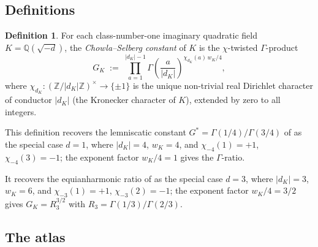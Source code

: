 \documentclass[11pt]{amsart}
\theoremstyle{plain}
\theoremstyle{definition}
\newtheorem{definition}[theorem]{Definition}
\theoremstyle{remark}
\newcommand{\Gs}{G^{*}}
\newcommand{\GK}{G_{K}}
\newcommand{\Z}{\mathbb{Z}}
\newcommand{\Q}{\mathbb{Q}}
\begin{document}
\subsection{Definitions}

\begin{definition}\label{def:G_K}
For each class-number-one imaginary quadratic field $K = \Q(\sqrt{-d})$,
the \emph{Chowla--Selberg constant} of $K$ is the $\chi$-twisted
$\Gamma$-product
\[
\GK \;:=\; \prod_{a=1}^{|d_K| - 1} \Gamma\!\left(\frac{a}{|d_K|}\right)^{\chi_{d_K}(a)\, w_K / 4},
\]
where $\chi_{d_K}: (\Z/|d_K|\Z)^{\times} \to \{\pm 1\}$ is the unique
non-trivial real Dirichlet character of conductor $|d_K|$ (the
Kronecker character of $K$), extended by zero to all integers.
\end{definition}

This definition recovers the lemniscatic constant
$\Gs = \Gamma(1/4)/\Gamma(3/4)$ of \cite{paper-gstar-A} as the special
case $d = 1$, where $|d_K| = 4$, $w_K = 4$, and $\chi_{-4}(1) = +1$,
$\chi_{-4}(3) = -1$; the exponent factor $w_K/4 = 1$ gives the
$\Gamma$-ratio.

It recovers the equianharmonic ratio of \cite{paper-gstar-A} as the
special case $d = 3$, where $|d_K| = 3$, $w_K = 6$, and
$\chi_{-3}(1) = +1$, $\chi_{-3}(2) = -1$; the exponent factor $w_K/4 = 3/2$
gives $\GK = R_{3}^{3/2}$ with $R_3 = \Gamma(1/3)/\Gamma(2/3)$.

\subsection{The atlas}
\end{document}
